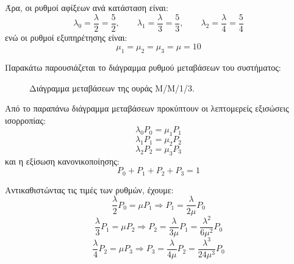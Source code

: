 \documentclass{article}
\begin{document}
Άρα, οι ρυθμοί αφίξεων ανά κατάσταση είναι:
\begin{equation}
\lambda_0=\frac{\lambda}{2}=\frac{5}{2}, \qquad
\lambda_1=\frac{\lambda}{3}=\frac{5}{3}, \qquad
\lambda_2=\frac{\lambda}{4}=\frac{5}{4}
\end{equation}
ενώ οι ρυθμοί εξυπηρέτησης είναι:
\begin{equation}
\mu_1=\mu_2=\mu_3=\mu=10
\end{equation}

Παρακάτω παρουσιάζεται το διάγραμμα ρυθμού μεταβάσεων του συστήματος:

\begin{figure}[h!]
\centering
{}
\caption{Διάγραμμα μεταβάσεων της ουράς M/M/1/3.}
\label{fig:mm13_transition}
\end{figure}

Από το παραπάνω διάγραμμα μεταβάσεων προκύπτουν οι λεπτομερείς εξισώσεις
ισορροπίας:
\begin{equation}
\lambda_0 P_0 = \mu_1 P_1
\end{equation}
\begin{equation}
\lambda_1 P_1 = \mu_2 P_2
\end{equation}
\begin{equation}
\lambda_2 P_2 = \mu_3 P_3
\end{equation}
και η εξίσωση κανονικοποίησης:
\begin{equation}
P_0 + P_1 + P_2 + P_3 = 1
\end{equation}

Αντικαθιστώντας τις τιμές των ρυθμών, έχουμε:
\begin{equation}
\frac{\lambda}{2}P_0 = \mu P_1
\Rightarrow
P_1 = \frac{\lambda}{2\mu}P_0
\end{equation}
\begin{equation}
\frac{\lambda}{3}P_1 = \mu P_2
\Rightarrow
P_2 = \frac{\lambda}{3\mu}P_1
= \frac{\lambda^2}{6\mu^2}P_0
\end{equation}
\begin{equation}
\frac{\lambda}{4}P_2 = \mu P_3
\Rightarrow
P_3 = \frac{\lambda}{4\mu}P_2
= \frac{\lambda^3}{24\mu^3}P_0
\end{equation}
\end{document}
